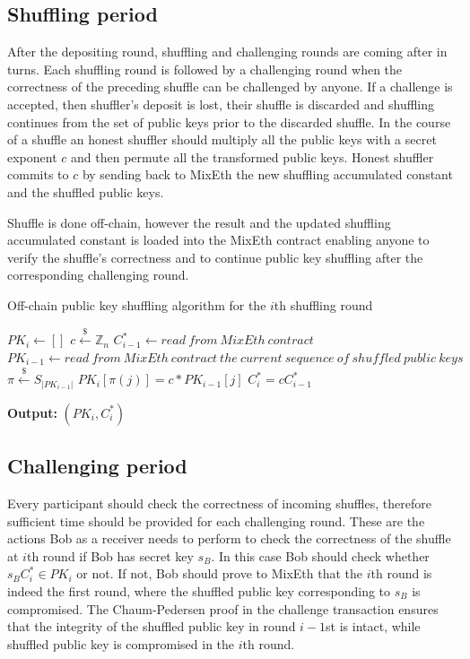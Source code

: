 \documentclass[a4paper]{article}
\theoremstyle{definition}
\begin{document}
\subsection{Shuffling period}
After the depositing round, shuffling and challenging rounds are coming after in turns. Each shuffling round is followed by a challenging round when the correctness of the preceding shuffle can be challenged by anyone. If a challenge is accepted, then shuffler's deposit is lost, their shuffle is discarded and shuffling continues from the set of public keys prior to the discarded shuffle. In the course of a shuffle an honest shuffler should multiply all the public keys with a secret exponent $c$ and then permute all the transformed public keys. Honest shuffler commits to $c$ by sending back to MixEth the new shuffling accumulated constant and the shuffled public keys.

Shuffle is done off-chain, however the result and the updated shuffling accumulated constant is loaded into the MixEth contract enabling anyone to verify the shuffle's correctness and to continue public key shuffling after the corresponding challenging round.

\begin{algorithm}
\caption{Off-chain public key shuffling algorithm for the $i$th shuffling round}\label{shufflingoffchain}
\begin{algorithmic}[1]
	\State $PK_{i} \gets []$
	\State $c\stackrel{\$}{\leftarrow}\mathbb{Z}_n$
	\State $C^{*}_{i-1}\leftarrow read\ from\ MixEth\ contract$
	\State $PK_{i-1}\leftarrow read\ from\ MixEth\ contract\ the\ current\ sequence\ of\ shuffled\ public\ keys$
	\State $\pi\stackrel{\$}{\leftarrow}S_{|PK_{i-1}|}$ 
	\State $PK_{i}[\pi(j)]=c*PK_{i-1}[j]$ 
	\EndFor
	\State $C^{*}_{i}=cC^{*}_{i-1}$
	
\hspace*{\algorithmicindent} \textbf{Output:} $(PK_{i},C^{*}_{i})$ 
\end{algorithmic}   
\end{algorithm}
\subsection{Challenging period}
Every participant should check the correctness of incoming shuffles, therefore sufficient time should be provided for each challenging round. These are the actions Bob as a receiver needs to perform to check the correctness of the shuffle at $i$th round if Bob has secret key $s_{B}$. In this case Bob should check whether $s_{B}C^{*}_{i} \in PK_{i}$ or not. If not, Bob should prove to MixEth that the $i$th round is indeed the first round, where the shuffled public key corresponding to $s_{B}$ is compromised. The Chaum-Pedersen proof in the challenge transaction ensures that the integrity of the shuffled public key in round $i-1$st is intact, while shuffled public key is compromised in the $i$th round.   
\end{document}
